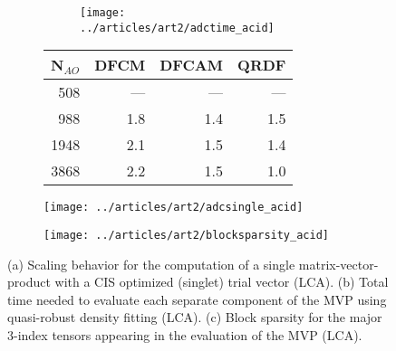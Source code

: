 \begin{figure}[htp]

\begin{subfigure}{\textwidth}
\begin{subfigure}{0.45\textwidth}
\centering
\texttt{[image: ../articles/art2/adctime\_acid]}
\end{subfigure}
\hfill
\begin{subtable}{0.45\textwidth}
\centering
\begin{tabular}{rrrr}
\hline
N$_{AO}$ & DFCM & DFCAM & QRDF \\ \hline
508 & --- & --- & --- \\ 
988 & 1.8 & 1.4 & 1.5 \\ 
1948 & 2.1 & 1.5 & 1.4 \\ 
3868 & 2.2 & 1.5 & 1.0 \\
 \hline
\end{tabular}
\end{subtable}
\caption{}
\label{fig:ES_TIME_LCA}
\end{subfigure}

\vspace{1.5\baselineskip}

\begin{subfigure}{0.45\textwidth}
\centering
\texttt{[image: ../articles/art2/adcsingle\_acid]}
\caption{}
\label{fig:ES_TIMESINGLE_LCA}
\end{subfigure}
\hfill
\begin{subfigure}{0.45\textwidth}
\centering
\texttt{[image: ../articles/art2/blocksparsity\_acid]}
\caption{}
\label{fig:ES_SPARSITY_LCA}
\end{subfigure}

\caption{(a) Scaling behavior for the computation of a single matrix-vector-product with a CIS optimized (singlet) trial vector (LCA). (b) Total time needed to evaluate each separate component of the MVP using quasi-robust density fitting (LCA). (c) Block sparsity for the major 3-index tensors appearing in the evaluation of the MVP (LCA).}

\end{figure}

